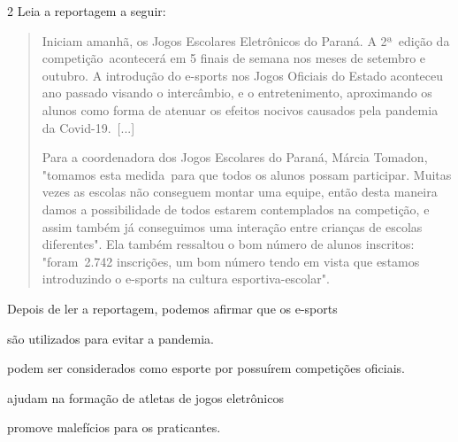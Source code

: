 \num{2}  Leia a reportagem a seguir:

\begin{quote}
Iniciam amanhã, os Jogos Escolares Eletrônicos do Paraná. A 2ª~edição da
competição~acontecerá em 5 finais de semana nos meses de setembro e
outubro. A introdução do e-sports nos Jogos Oficiais do Estado aconteceu
ano passado visando o intercâmbio, e o entretenimento, aproximando os
alunos como forma de atenuar os efeitos nocivos causados pela pandemia
da Covid-19.~{[}...{]}

Para a coordenadora dos Jogos Escolares do Paraná, Márcia Tomadon,
"tomamos esta medida~para que todos os alunos possam participar. Muitas
vezes as escolas não conseguem montar uma equipe, então desta maneira
damos a possibilidade de todos estarem contemplados na competição, e
assim também já conseguimos uma interação entre crianças de escolas
diferentes". Ela também ressaltou o bom número de alunos inscritos:
"foram~2.742 inscrições, um bom número tendo em vista que estamos
introduzindo o e-sports na cultura esportiva-escolar".~

\end{quote}

Depois de ler a reportagem, podemos afirmar que os e-sports

\begin{escolha}
\item são utilizados para evitar a pandemia.

\item podem ser considerados como esporte por possuírem competições
oficiais.

\item ajudam na formação de atletas de jogos eletrônicos

\item promove malefícios para os praticantes.
\end{escolha}



